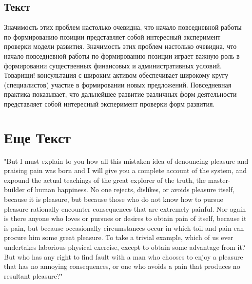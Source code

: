 \documentclass[a4paper,14pt]{extarticle}
\begin{document}
\subsection{Текст}
Значимость этих проблем настолько очевидна, что начало повседневной работы по формированию позиции представляет собой интересный эксперимент проверки модели развития. Значимость этих проблем настолько очевидна, что начало повседневной работы по формированию позиции играет важную роль в формировании существенных финансовых и административных условий. Товарищи! консультация с широким активом обеспечивает широкому кругу (специалистов) участие в формировании новых предложений. Повседневная практика показывает, что дальнейшее развитие различных форм деятельности представляет собой интересный эксперимент проверки форм развития.
\section{Еще Текст}
"But I must explain to you how all this mistaken idea of denouncing pleasure and praising pain was born and I will give you a complete account of the system, and expound the actual teachings of the great explorer of the truth, the master-builder of human happiness. No one rejects, dislikes, or avoids pleasure itself, because it is pleasure, but because those who do not know how to pursue pleasure rationally encounter consequences that are extremely painful. Nor again is there anyone who loves or pursues or desires to obtain pain of itself, because it is pain, but because occasionally circumstances occur in which toil and pain can procure him some great pleasure. To take a trivial example, which of us ever undertakes laborious physical exercise, except to obtain some advantage from it? But who has any right to find fault with a man who chooses to enjoy a pleasure that has no annoying consequences, or one who avoids a pain that produces no resultant pleasure?"
\end{document}
